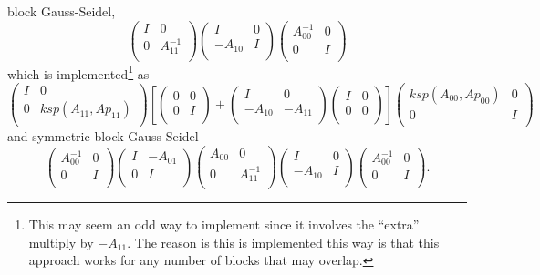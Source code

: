 block Gauss-Seidel,
\[
\left( \begin{array}{cc}
I   & 0 \\
0 & A^{-1}_{11} \\
\end{array} \right)
\left( \begin{array}{cc}
I   & 0 \\
-A_{10} & I \\
\end{array} \right)
\left( \begin{array}{cc}
A^{-1}_{00}   & 0 \\
0 & I \\
\end{array} \right)
\]
which is implemented\footnote{This may seem an odd way to implement since it involves the ``extra'' multiply by $ -A_{11}$. The reason is this is implemented this way is that this approach works for any number of blocks that may overlap.} as 
\[
\left( \begin{array}{cc}
I   & 0 \\
0 & ksp(A_{11},Ap_{11}) \\
\end{array} \right)
\left[
\left( \begin{array}{cc}
0   & 0 \\
0 & I \\
\end{array} \right)
+
\left( \begin{array}{cc}
I   & 0 \\
-A_{10} & -A_{11} \\
\end{array} \right)
\left( \begin{array}{cc}
I   & 0 \\
0 & 0 \\
\end{array} \right)
\right]
\left( \begin{array}{cc}
ksp(A_{00},Ap_{00})   & 0 \\
0 & I \\
\end{array} \right)
\]
 and symmetric block Gauss-Seidel
\[
\left( \begin{array}{cc}
A_{00}^{-1}   & 0 \\
0 & I \\
\end{array} \right)
\left( \begin{array}{cc}
I   & -A_{01} \\
0 & I \\
\end{array} \right)
\left( \begin{array}{cc}
A_{00}   & 0 \\
0 & A_{11}^{-1} \\
\end{array} \right)
\left( \begin{array}{cc}
I   & 0 \\
-A_{10} & I \\
\end{array} \right)
\left( \begin{array}{cc}
A_{00}^{-1}   & 0 \\
0 & I \\
\end{array} \right).
\]
